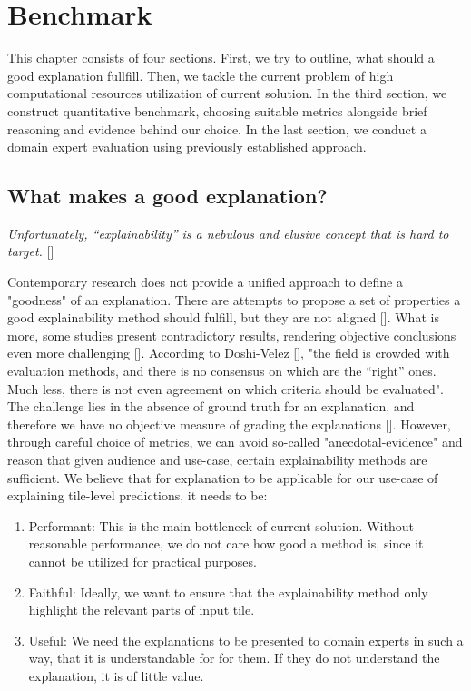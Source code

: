 \chapter{Benchmark}

This chapter consists of four sections. First, we try to outline, what should a good explanation fullfill. Then, we tackle the current problem of high computational resources utilization of current solution. In the third section, we construct quantitative benchmark, choosing suitable metrics alongside brief reasoning and evidence behind our choice. In the last section, we conduct a domain expert evaluation using previously established approach.

\section{What makes a good explanation?}

\emph{Unfortunately, “explainability” is a nebulous and elusive concept that is hard to target.} []
\newline

\noindent

Contemporary research does not provide a unified approach to define a "goodness" of an explanation. There are attempts to propose a set of properties a good explainability method should fulfill, but they are not aligned []. What is more, some studies present contradictory results, rendering objective conclusions even more challenging []. According to Doshi-Velez [], "the field is crowded with evaluation methods, and there is no consensus on which are the “right” ones. Much less, there is not even agreement on which criteria should be evaluated". The challenge lies in the absence of ground truth for an explanation, and therefore we have no objective measure of grading the explanations []. However, through careful choice of metrics, we can avoid so-called "anecdotal-evidence" and reason that given audience and use-case, certain explainability methods are sufficient. We believe that for explanation to be applicable for our use-case of explaining tile-level predictions, it needs to be:


\begin{enumerate}
    \item Performant: This is the main bottleneck of current solution. Without reasonable performance, we do not care how good a method is, since it cannot be utilized for practical purposes.
    \item Faithful: Ideally, we want to ensure that the explainability method only highlight the relevant parts of input tile.
    \item Useful: We need the explanations to be presented to domain experts in such a way, that it is understandable for for them. If they do not understand the explanation, it is of little value. 
\end{enumerate}

